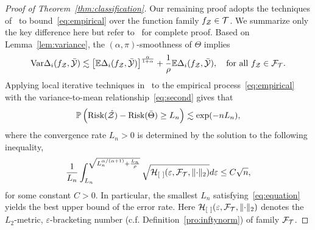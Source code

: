 \documentclass[11pt]{article}
\theoremstyle{plain}
\theoremstyle{definition}
\def\risk{\textup{Risk}}
\begin{document}
\begin{proof}[Proof of Theorem~\ref{thm:classification}]
Our remaining proof adopts the techniques of~\citet[Theorem 3]{wang2008probability} to bound~\eqref{eq:empirical} over the function family $f_{\mathcal{Z}}\in \mathcal{T}$. We summarize only the key difference here but refer to~\citep{wang2008probability} for complete proof. 
Based on Lemma~\ref{lem:variance}, the $(\alpha,\pi)$-smoothness of $\Theta$ implies 
\begin{equation}\label{eq:second}
\textup{Var}\Delta_i(f_{\mathcal{Z}},\bar {\mathcal{Y}}) \lesssim \left[\mathbb{E}\Delta_i(f_{\mathcal{Z}},\bar {\mathcal{Y}})\right]^{\alpha \over 1+\alpha}+{1\over \rho}\mathbb{E}\Delta_i(f_{\mathcal{Z}},\bar {\mathcal{Y}}),\quad \text{for all $f_{\mathcal{Z}}\in \mathcal{F}_{\mathcal{T}}$}.
\end{equation}
Applying local iterative techniques in~\citet[Theorem 3]{wang2008probability} to the empirical process~\eqref{eq:empirical} with the variance-to-mean relationship~\eqref{eq:second} gives that
\begin{equation}\label{eq:rate}
\mathbb{P}\left(\risk(\hat \tZ)-\risk(\bar \Theta )\geq L_n\right)\lesssim \exp(-nL_n),
\end{equation}
where the convergence rate $L_n>0$ is determined by the solution to the following inequality,
\begin{equation}\label{eq:equation}
{1\over L_n}\int_{L_n}^{\sqrt{L_n^{\alpha/(\alpha+1)}+{L_n\over \rho}}}\sqrt{\mathcal{H}_{[\ ]}(\varepsilon,\mathcal{F}_{\mathcal{T}}, \lVert\cdot\rVert_2) }d\varepsilon \leq C\sqrt{n},
\end{equation}
for some constant $C>0$. In particular, the smallest $L_n$ satisfying~\eqref{eq:equation} yields the best upper bound of the error rate. Here $\tH_{[\ ]}(\varepsilon, \tF_{\tT},\vnormSize{}{\cdot})$ denotes the $L_2$-metric, $\varepsilon$-bracketing number (c.f. Definition~\ref{pro:inftynorm}) of family $\mathcal{F}_{\mathcal{T}}$. 


\end{proof}
\end{document}
